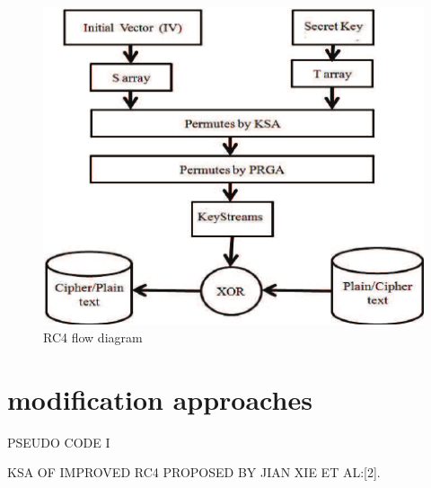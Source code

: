 \documentclass[conference]{IEEEtran}
\begin{document}
\begin{figure}[H]
    \centering
    \includegraphics[width=\linewidth]{Encryption-and-decryption-by-RC4}
    \caption{RC4 flow diagram}
    \label{fig:my_label}
\end{figure}

\section{modification approaches}\newline
\newline
\newline


\centerline {PSEUDO CODE I} 
KSA OF IMPROVED RC4 PROPOSED BY JIAN XIE ET AL:[2].\newline \newline \newline
\end{document}
